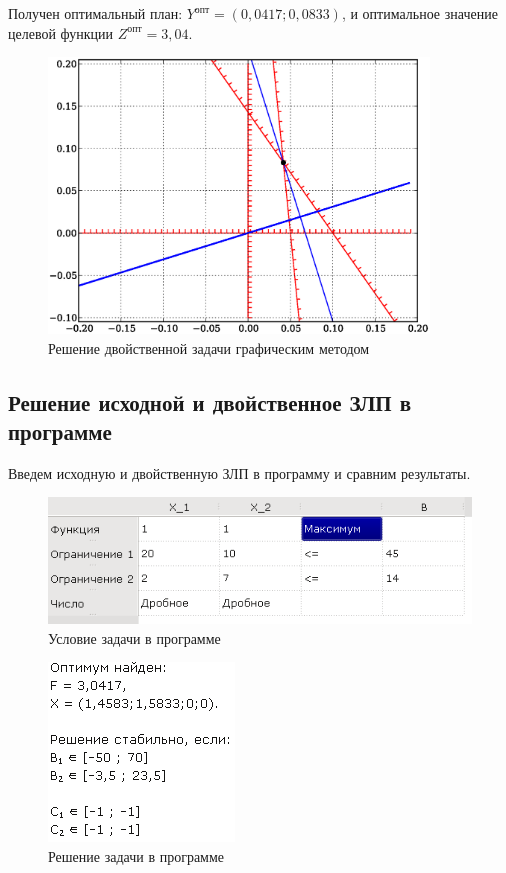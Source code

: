 Получен оптимальный план: $Y^{опт} = (0,0417;0,0833)$, и оптимальное значение целевой функции $Z^{опт} = 3,04$.
\clearpage
\begin{figure}[ht]
\centering
\includegraphics[width=0.9\textwidth]{img/12}
\caption{Решение двойственной задачи графическим методом}
\end{figure}

\subsection{Решение исходной и двойственное ЗЛП в программе}
Введем исходную и двойственную ЗЛП в программу и сравним результаты.

\begin{figure}[hb]
\centering
\includegraphics[scale=1.0]{img/problem11.png}
\caption{Условие задачи в программе}
\end{figure}
\newpage
\clearpage

\begin{figure}[ht]
\centering
\includegraphics[scale=1.0]{img/solution11.png}
\caption{Решение задачи в программе}
\end{figure}

